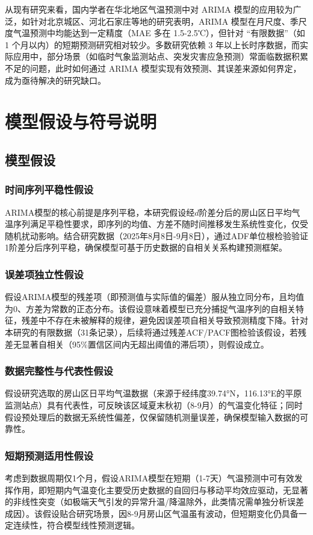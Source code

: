 \documentclass[withoutpreface,bwprint]{cumcmthesis} %
\begin{document}
从现有研究来看，国内学者在华北地区气温预测中对 ARIMA 模型的应用较为广泛，如针对北京城区、河北石家庄等地的研究表明，ARIMA 模型在月尺度、季尺度气温预测中均能达到一定精度（MAE 多在 1.5-2.5℃），但针对 “有限数据”（如 1 个月以内）的短期预测研究相对较少。多数研究依赖 3 年以上长时序数据，而实际应用中，部分场景（如临时气象监测站点、突发灾害应急预测）常面临数据积累不足的问题，此时如何通过 ARIMA 模型实现有效预测、其误差来源如何界定，成为亟待解决的研究缺口。
\section{模型假设与符号说明}
\label{sec:model_assumption}

\subsection{模型假设}
\label{subsec:model_assumptions}

\subsubsection{时间序列平稳性假设}
ARIMA模型的核心前提是序列平稳，本研究假设经$d$阶差分后的房山区日平均气温序列满足平稳性要求，即序列的均值、方差不随时间推移发生系统性变化，仅受随机扰动影响。结合研究数据（2025年8月8日-9月8日），通过ADF单位根检验验证1阶差分后序列平稳，确保模型可基于历史数据的自相关关系构建预测框架。

\subsubsection{误差项独立性假设}
假设ARIMA模型的残差项（即预测值与实际值的偏差）服从独立同分布，且均值为0、方差为常数的正态分布。该假设意味着模型已充分捕捉气温序列的自相关特征，残差中不存在未被解释的规律，避免因误差项自相关导致预测精度下降。针对本研究的有限数据（31条记录），后续将通过残差ACF/PACF图检验该假设，若残差无显著自相关（95\%置信区间内无超出阈值的滞后项），则假设成立。

\subsubsection{数据完整性与代表性假设}
假设研究选取的房山区日平均气温数据（来源于经纬度39.74°N，116.13°E的平原监测站点）具有代表性，可反映该区域夏末秋初（8-9月）的气温变化特征；同时假设预处理后的数据无系统性偏差，仅保留随机测量误差，确保模型输入数据的可靠性。

\subsubsection{短期预测适用性假设}
考虑到数据周期仅1个月，假设ARIMA模型在短期（1-7天）气温预测中可有效发挥作用，即短期内气温变化主要受历史数据的自回归与移动平均效应驱动，无显著的非线性突变（如极端天气引发的异常升温/降温除外，此类情况需单独分析误差成因）。该假设贴合研究场景，因8-9月房山区气温虽有波动，但短期变化仍具备一定连续性，符合模型线性预测逻辑。
\end{document}
